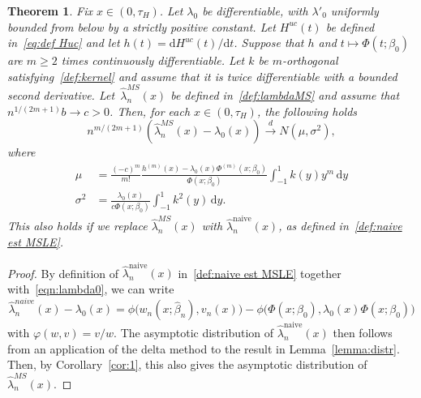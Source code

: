 \documentclass[11pt,reqno]{amsart}
\theoremstyle{definition}
\theoremstyle{plain}
\newtheorem{theo}[de]{Theorem}
\theoremstyle{remark}
\begin{document}
\begin{theo}
\label{theo:distrMS}
Fix $x\in(0,\tau_H)$.
Let $\lambda_0$ be differentiable, with $\lambda'_0$ uniformly bounded from below by a strictly positive constant.
Let $H^{uc}(t)$ be defined in~\eqref{eq:def Huc} and let $h(t)=\mathrm{d}H^{uc}(t)/\mathrm{d}t$.
Suppose that $h$ and $t\mapsto\Phi(t;\beta_0)$ are $m\geq 2$ times continuously differentiable.
Let $k$ be $m$-orthogonal satisfying~\eqref{def:kernel} and assume that it is twice differentiable with a bounded second derivative.
Let~$\hat{\lambda}^{MS}_n(x)$ be defined in~\eqref{def:lambdaMS} and assume that $n^{1/(2m+1)}b\to c>0$.
Then, for each $x\in(0,\tau_H)$, the following holds
\[
n^{m/(2m+1)}
\left(\hat{\lambda}^{MS}_n(x)-\lambda_0(x)\right)\xrightarrow{d} N(\mu,\sigma^2),
\]
where
\begin{equation}
\label{def:mu sigma}
\begin{split}
\mu
&=
\frac{(-c)^m}{m!}
\frac{h^{(m)}(x)-\lambda_0(x)\Phi^{(m)}(x;\beta_0)}{\Phi(x;\beta_0)}
\int_{-1}^1 k(y)y^m\,\mathrm{d}y\\
\sigma^2
&=
\frac{\lambda_0(x)}{c\Phi(x;\beta_0)}\int_{-1}^1 k^2(y)\,\mathrm{d}y.
\end{split}
\end{equation}
This also holds if we replace $\hat{\lambda}^{MS}_n(x)$ with $\hat{\lambda}_n^{\mathrm{naive}}(x)$, as defined in~\eqref{def:naive est MSLE}.
\end{theo}
\begin{proof}
By definition of $\hat{\lambda}_n^{\mathrm{naive}}(x)$ in~\eqref{def:naive est MSLE} together with~\eqref{eqn:lambda0},
we can write
\[
\hat{\lambda}_n^{naive}(x)-\lambda_0(x)
=
\phi\Big(w_n(x;\hat\beta_n),v_n(x)\Big)
-
\phi\Big(\Phi(x;\beta_0),\lambda_0(x)\Phi(x;\beta_0)\Big)
\]
with $\varphi(w,v)=v/w$.
The asymptotic distribution of $\hat{\lambda}_n^{\mathrm{naive}}(x)$ then follows from an application of the delta method to the result in Lemma~\ref{lemma:distr}.
Then, by Corollary~\ref{cor:1}, this also gives the asymptotic distribution of $\hat{\lambda}^{MS}_n(x)$.
\end{proof}
\end{document}
